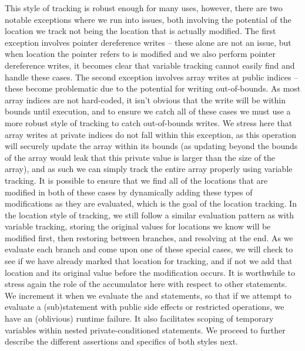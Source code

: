 This style of tracking is robust enough for many uses, however, there are two notable exceptions where we run into issues, both involving the potential of the location we track not being the location that is actually modified. 
The first exception involves pointer dereference writes -- these alone are not an issue, but when location the pointer refers to is modified and we also perform pointer dereference writes, it becomes clear that variable tracking cannot easily find and handle these cases. 
The second exception involves array writes at public indices -- these become problematic due to the potential for writing out-of-bounds. As most array indices are not hard-coded, it isn't obvious that the write will be within bounds until execution, and to ensure we catch all of these cases we must use a more robust style of tracking to catch out-of-bounds writes. We stress here that array writes at private indices do not fall within this exception, as this operation will securely update the array within its bounds (as updating beyond the bounds of the array would leak that this private value is larger than the size of the array), and as such we can simply track the entire array properly using variable tracking.  
It is possible to ensure that we find all of the locations that are modified in both of these cases by dynamically adding these types of modifications as they are evaluated, which is the goal of the location tracking. 
In the location style of tracking, we still follow a similar evaluation pattern as with variable tracking, storing the original values for locations we know will be modified first, then restoring between branches, and resolving at the end. As we evaluate each branch and come upon one of these special cases, we will check to see if we have already marked that location for tracking, and if not we add that location and its original value before the modification occurs. 
It is worthwhile to stress again the role of the accumulator here with respect to other statements. We increment it when we evaluate the  and  statements, so that if we attempt to evaluate a (sub)statement with public side effects or restricted operations, we have an (oblivious) runtime failure. It also facilitates scoping of temporary variables within nested private-conditioned  statements.
We proceed to further describe the different assertions and specifics of both styles next. 



%


